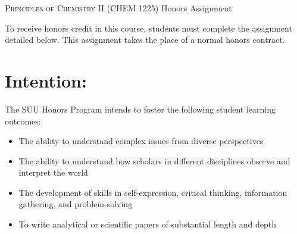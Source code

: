 \documentclass[12pt, letterpaper]{article}
\begin{document}
\begin{center}
	{\Large \textsc{Principles of Chemistry II} (CHEM 1225) Honors Assignment}
\end{center}

To receive honors credit in this course, students must complete the assignment detailed below. This assignment takes the place of a normal honors contract.

\section*{Intention:}
The SUU Honors Program intends to foster the following student learning outcomes:
\begin{itemize}
  \item The ability to understand complex issues from diverse perspectives
  \item The ability to understand how scholars in different disciplines observe and interpret the world
  \item The development of skills in self-expression, critical thinking, information gathering, and problem-solving
  \item To write analytical or scientific papers of substantial length and depth
\end{itemize}
\end{document}
